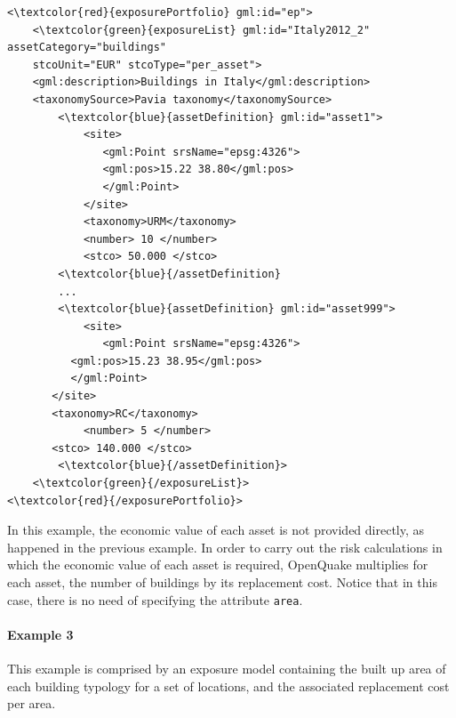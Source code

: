 \begin{Verbatim}[frame=single, commandchars=\\\{\}, samepage=false]
<\textcolor{red}{exposurePortfolio} gml:id="ep">
    <\textcolor{green}{exposureList} gml:id="Italy2012_2" assetCategory="buildings" 
    stcoUnit="EUR" stcoType="per_asset">
    <gml:description>Buildings in Italy</gml:description>
    <taxonomySource>Pavia taxonomy</taxonomySource>
        <\textcolor{blue}{assetDefinition} gml:id="asset1">
            <site>
               <gml:Point srsName="epsg:4326">
               <gml:pos>15.22 38.80</gml:pos>
               </gml:Point>
            </site>
            <taxonomy>URM</taxonomy>
            <number> 10 </number>
            <stco> 50.000 </stco>
        <\textcolor{blue}{/assetDefinition} 
        ...
        <\textcolor{blue}{assetDefinition} gml:id="asset999">
            <site>
               <gml:Point srsName="epsg:4326">
	      <gml:pos>15.23 38.95</gml:pos>
	      </gml:Point>
	   </site>
	   <taxonomy>RC</taxonomy>
            <number> 5 </number>
	   <stco> 140.000 </stco>
        <\textcolor{blue}{/assetDefinition}> 
    <\textcolor{green}{/exposureList}>
<\textcolor{red}{/exposurePortfolio}>
\end{Verbatim}

In this example, the economic value of each asset is not provided directly, as happened in the previous example. In order to carry out the risk calculations in which the economic value of each asset is required, OpenQuake multiplies for each asset, the number of buildings by its replacement cost. Notice that in this case, there is no need of specifying the attribute \Verb+area+. 

\paragraph{Example 3}
This example is comprised by an exposure model containing the built up area of each building typology for a set of locations, and the associated replacement cost per area.

